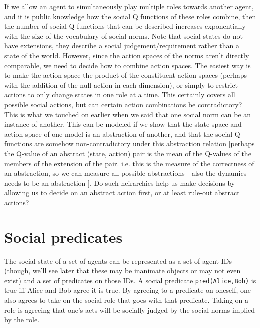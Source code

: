 \documentclass[a4paper]{article}
\begin{document}
If we allow an agent to simultaneously play multiple roles towards another agent, and it is public knowledge how the social Q functions of these roles combine, then the number of social Q functions that can be described increases exponentially with the size of the vocabulary of social norms. Note that social states do not have extensions, they describe a social judgement/requirement rather than a state of the world. However, since the action spaces of the norms aren't directly comparable, we need to decide how to combine action spaces. The easiest way is to make the action space the product of the constituent action spaces (perhaps with the addition of the null action in each dimension), or simply to restrict actions to only change states in one role at a time. This certainly covers all possible social actions, but can certain action combinations be contradictory? This is what we touched on earlier when we said that one social norm can be an instance of another. This can be modeled if we show that the state space and action space of one model is an abstraction of another, and that the social Q-functions are somehow non-contradictory under this abstraction relation [perhaps the Q-value of an abstract (state, action) pair is the mean of the Q-values of the members of the extension of the pair. i.e. this is the measure of the correctness of an abstraction, so we can measure all possible abstractions - also the dynamics needs to be an abstraction ]. Do such heirarchies help us make decisions by allowing us to decide on an abstract action first, or at least rule-out abstract actions?

\section{Social predicates}

The social state of a set of agents can be represented as a set of agent IDs (though, we'll see later that these may be inanimate objects or may not even exist) and a set of predicates on those IDs. A social predicate \texttt{pred(Alice,Bob)} is true iff Alice and Bob agree it is true. By agreeing to a predicate on oneself, one also agrees to take on the social role that goes with that predicate. Taking on a role is agreeing that one's acts will be socially judged by the social norms implied by the role.
\end{document}
